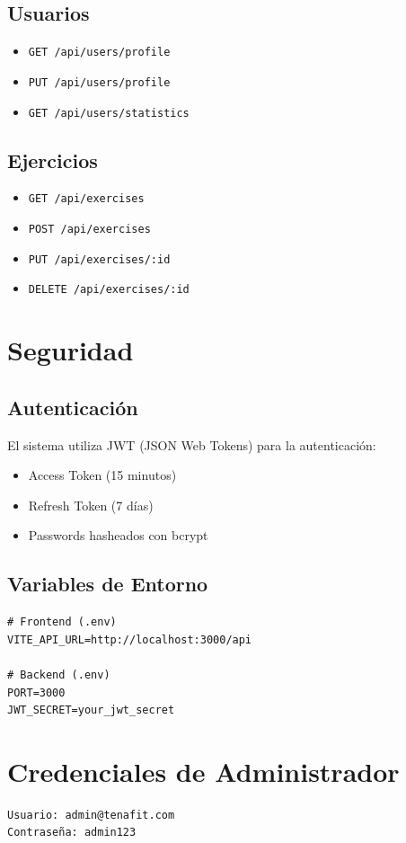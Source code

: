\documentclass[12pt,a4paper]{article}
\begin{document}
\subsection{Usuarios}
\begin{itemize}
    \item \texttt{GET /api/users/profile}
    \item \texttt{PUT /api/users/profile}
    \item \texttt{GET /api/users/statistics}
\end{itemize}

\subsection{Ejercicios}
\begin{itemize}
    \item \texttt{GET /api/exercises}
    \item \texttt{POST /api/exercises}
    \item \texttt{PUT /api/exercises/:id}
    \item \texttt{DELETE /api/exercises/:id}
\end{itemize}

\section{Seguridad}

\subsection{Autenticación}
El sistema utiliza JWT (JSON Web Tokens) para la autenticación:
\begin{itemize}
    \item Access Token (15 minutos)
    \item Refresh Token (7 días)
    \item Passwords hasheados con bcrypt
\end{itemize}

\subsection{Variables de Entorno}
\begin{verbatim}
# Frontend (.env)
VITE_API_URL=http://localhost:3000/api

# Backend (.env)
PORT=3000
JWT_SECRET=your_jwt_secret
\end{verbatim}

\section{Credenciales de Administrador}
\begin{verbatim}
Usuario: admin@tenafit.com
Contraseña: admin123
\end{verbatim}
\end{document}
